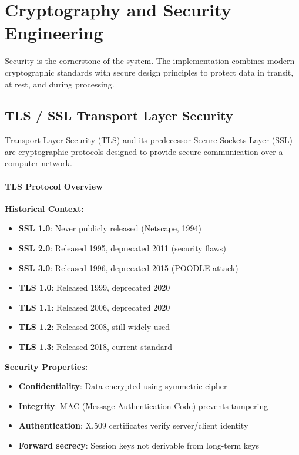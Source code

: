 \section{Cryptography and Security Engineering}

Security is the cornerstone of the system. The implementation combines modern cryptographic standards with secure design principles to protect data in transit, at rest, and during processing.

\subsection{TLS / SSL Transport Layer Security}

Transport Layer Security (TLS) and its predecessor Secure Sockets Layer (SSL) are cryptographic protocols designed to provide secure communication over a computer network.

\paragraph{TLS Protocol Overview}

\textbf{Historical Context:}
\begin{itemize}
    \item \textbf{SSL 1.0}: Never publicly released (Netscape, 1994)
    \item \textbf{SSL 2.0}: Released 1995, deprecated 2011 (security flaws)
    \item \textbf{SSL 3.0}: Released 1996, deprecated 2015 (POODLE attack)
    \item \textbf{TLS 1.0}: Released 1999, deprecated 2020
    \item \textbf{TLS 1.1}: Released 2006, deprecated 2020
    \item \textbf{TLS 1.2}: Released 2008, still widely used
    \item \textbf{TLS 1.3}: Released 2018, current standard
\end{itemize}

\textbf{Security Properties:}
\begin{itemize}
    \item \textbf{Confidentiality}: Data encrypted using symmetric cipher
    \item \textbf{Integrity}: MAC (Message Authentication Code) prevents tampering
    \item \textbf{Authentication}: X.509 certificates verify server/client identity
    \item \textbf{Forward secrecy}: Session keys not derivable from long-term keys
\end{itemize}

